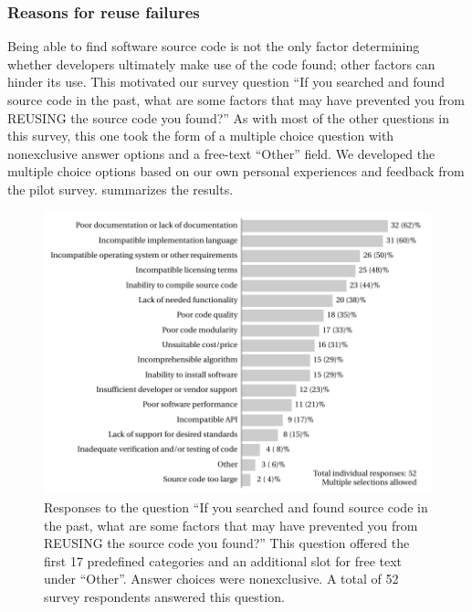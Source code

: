 \documentclass{casicswhitepaper}
\begin{document}
\subsubsection{Reasons for reuse failures}
\label{reuse-failures}

Being able to find software source code is not the only factor determining whether developers ultimately make use of the code found; other factors can hinder its use.  This motivated our survey question ``If you searched and found source code in the past, what are some factors that may have prevented you from REUSING the source code you found?''  As with most of the other questions in this survey, this one took the form of a multiple choice question with nonexclusive answer options and a free-text ``Other'' field.  We developed the multiple choice options based on our own personal experiences and feedback from the pilot survey.   summarizes the results.

\begin{figure}[thb]
  \centering
  \includegraphics[width=5.65in]{files/plots/hindrance-to-reusing-src.pdf}
  \vspace*{-1.5ex}
  \caption{Responses to the question ``If you searched and found source code in the past, what are some factors that may have prevented you from REUSING the source code you found?''  This question offered the first 17 predefined categories and an additional slot for free text under ``Other''.  Answer choices were nonexclusive.  A total of 52 survey respondents answered this question.}
  \label{hindrance-to-reusing-src}
\end{figure}
\end{document}
